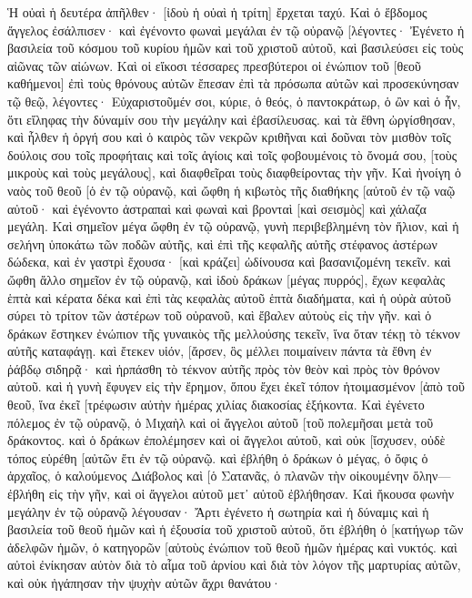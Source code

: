 Ἡ οὐαὶ ἡ δευτέρα ἀπῆλθεν· [ἰδοὺ ἡ οὐαὶ ἡ τρίτη] ἔρχεται ταχύ. 
Καὶ ὁ ἕβδομος ἄγγελος ἐσάλπισεν· καὶ ἐγένοντο φωναὶ μεγάλαι ἐν τῷ οὐρανῷ [λέγοντες· Ἐγένετο ἡ βασιλεία τοῦ κόσμου τοῦ κυρίου ἡμῶν καὶ τοῦ χριστοῦ αὐτοῦ, καὶ βασιλεύσει εἰς τοὺς αἰῶνας τῶν αἰώνων. 
Καὶ οἱ εἴκοσι τέσσαρες πρεσβύτεροι οἱ ἐνώπιον τοῦ [θεοῦ καθήμενοι] ἐπὶ τοὺς θρόνους αὐτῶν ἔπεσαν ἐπὶ τὰ πρόσωπα αὐτῶν καὶ προσεκύνησαν τῷ θεῷ, 
λέγοντες· Εὐχαριστοῦμέν σοι, κύριε, ὁ θεός, ὁ παντοκράτωρ, ὁ ὢν καὶ ὁ ἦν, ὅτι εἴληφας τὴν δύναμίν σου τὴν μεγάλην καὶ ἐβασίλευσας. 
καὶ τὰ ἔθνη ὠργίσθησαν, καὶ ἦλθεν ἡ ὀργή σου καὶ ὁ καιρὸς τῶν νεκρῶν κριθῆναι καὶ δοῦναι τὸν μισθὸν τοῖς δούλοις σου τοῖς προφήταις καὶ τοῖς ἁγίοις καὶ τοῖς φοβουμένοις τὸ ὄνομά σου, [τοὺς μικροὺς καὶ τοὺς μεγάλους], καὶ διαφθεῖραι τοὺς διαφθείροντας τὴν γῆν. 
Καὶ ἠνοίγη ὁ ναὸς τοῦ θεοῦ [ὁ ἐν τῷ οὐρανῷ, καὶ ὤφθη ἡ κιβωτὸς τῆς διαθήκης [αὐτοῦ ἐν τῷ ναῷ αὐτοῦ· καὶ ἐγένοντο ἀστραπαὶ καὶ φωναὶ καὶ βρονταὶ [καὶ σεισμὸς] καὶ χάλαζα μεγάλη. 
Καὶ σημεῖον μέγα ὤφθη ἐν τῷ οὐρανῷ, γυνὴ περιβεβλημένη τὸν ἥλιον, καὶ ἡ σελήνη ὑποκάτω τῶν ποδῶν αὐτῆς, καὶ ἐπὶ τῆς κεφαλῆς αὐτῆς στέφανος ἀστέρων δώδεκα, 
καὶ ἐν γαστρὶ ἔχουσα· [καὶ κράζει] ὠδίνουσα καὶ βασανιζομένη τεκεῖν. 
καὶ ὤφθη ἄλλο σημεῖον ἐν τῷ οὐρανῷ, καὶ ἰδοὺ δράκων [μέγας πυρρός], ἔχων κεφαλὰς ἑπτὰ καὶ κέρατα δέκα καὶ ἐπὶ τὰς κεφαλὰς αὐτοῦ ἑπτὰ διαδήματα, 
καὶ ἡ οὐρὰ αὐτοῦ σύρει τὸ τρίτον τῶν ἀστέρων τοῦ οὐρανοῦ, καὶ ἔβαλεν αὐτοὺς εἰς τὴν γῆν. καὶ ὁ δράκων ἕστηκεν ἐνώπιον τῆς γυναικὸς τῆς μελλούσης τεκεῖν, ἵνα ὅταν τέκῃ τὸ τέκνον αὐτῆς καταφάγῃ. 
καὶ ἔτεκεν υἱόν, [ἄρσεν, ὃς μέλλει ποιμαίνειν πάντα τὰ ἔθνη ἐν ῥάβδῳ σιδηρᾷ· καὶ ἡρπάσθη τὸ τέκνον αὐτῆς πρὸς τὸν θεὸν καὶ πρὸς τὸν θρόνον αὐτοῦ. 
καὶ ἡ γυνὴ ἔφυγεν εἰς τὴν ἔρημον, ὅπου ἔχει ἐκεῖ τόπον ἡτοιμασμένον [ἀπὸ τοῦ θεοῦ, ἵνα ἐκεῖ [τρέφωσιν αὐτὴν ἡμέρας χιλίας διακοσίας ἑξήκοντα. 
Καὶ ἐγένετο πόλεμος ἐν τῷ οὐρανῷ, ὁ Μιχαὴλ καὶ οἱ ἄγγελοι αὐτοῦ [τοῦ πολεμῆσαι μετὰ τοῦ δράκοντος. καὶ ὁ δράκων ἐπολέμησεν καὶ οἱ ἄγγελοι αὐτοῦ, 
καὶ οὐκ [ἴσχυσεν, οὐδὲ τόπος εὑρέθη [αὐτῶν ἔτι ἐν τῷ οὐρανῷ. 
καὶ ἐβλήθη ὁ δράκων ὁ μέγας, ὁ ὄφις ὁ ἀρχαῖος, ὁ καλούμενος Διάβολος καὶ [ὁ Σατανᾶς, ὁ πλανῶν τὴν οἰκουμένην ὅλην—ἐβλήθη εἰς τὴν γῆν, καὶ οἱ ἄγγελοι αὐτοῦ μετ᾽ αὐτοῦ ἐβλήθησαν. 
Καὶ ἤκουσα φωνὴν μεγάλην ἐν τῷ οὐρανῷ λέγουσαν· Ἄρτι ἐγένετο ἡ σωτηρία καὶ ἡ δύναμις καὶ ἡ βασιλεία τοῦ θεοῦ ἡμῶν καὶ ἡ ἐξουσία τοῦ χριστοῦ αὐτοῦ, ὅτι ἐβλήθη ὁ [κατήγωρ τῶν ἀδελφῶν ἡμῶν, ὁ κατηγορῶν [αὐτοὺς ἐνώπιον τοῦ θεοῦ ἡμῶν ἡμέρας καὶ νυκτός. 
καὶ αὐτοὶ ἐνίκησαν αὐτὸν διὰ τὸ αἷμα τοῦ ἀρνίου καὶ διὰ τὸν λόγον τῆς μαρτυρίας αὐτῶν, καὶ οὐκ ἠγάπησαν τὴν ψυχὴν αὐτῶν ἄχρι θανάτου· 
